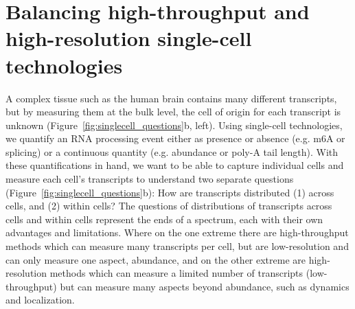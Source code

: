 

\section{Balancing high-throughput and high-resolution single-cell technologies}

A complex tissue such as the human brain contains many different transcripts, but by measuring them at the bulk level, the cell of origin for each transcript is unknown (Figure~\ref{fig:singlecell_questions}b, left). Using single-cell technologies, we quantify an RNA processing event either as presence or absence (e.g. m6A or splicing) or a continuous quantity (e.g. abundance or poly-A tail length). With these quantifications in hand, we want to be able to capture individual cells and measure each cell's transcripts to understand two separate questions (Figure~\ref{fig:singlecell_questions}b): How are transcripts distributed (1) across cells, and (2) within cells?
	The questions of distributions of transcripts across cells and within cells represent the ends of a spectrum, each with their own advantages and limitations. Where on the one extreme there are high-throughput methods which can measure many transcripts per cell, but are low-resolution and can only measure one aspect, abundance, and on the other extreme are high-resolution methods which can measure a limited number of transcripts (low-throughput) but can measure many aspects beyond abundance, such as dynamics and localization.


